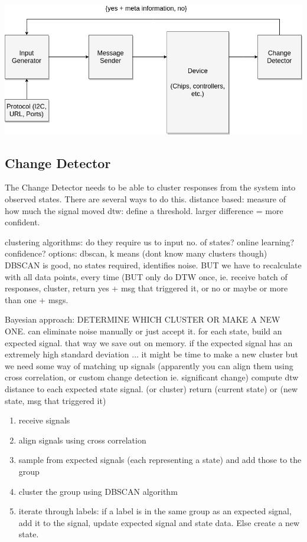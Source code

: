 \documentclass[11pt, a4paper]{article}
\begin{document}
\includegraphics[scale=0.5]{Fuzzer.png}

\subsection*{Change Detector}
The Change Detector needs to be able to cluster responses from the system into observed states.
There are several ways to do this.
distance based: measure of how much the signal moved
dtw: define a threshold. larger difference = more confident.

clustering algorithms: do they require us to input no. of states? online learning? confidence?
options: dbscan, k means (dont know many clusters though)
DBSCAN is good, no states required, identifies noise. BUT we have to recalculate with all data points, every time (BUT only do DTW once, ie. 
receive batch of responses, cluster, return yes + msg that triggered it, or no or maybe or more than one + msgs.

Bayesian approach: DETERMINE WHICH CLUSTER OR MAKE A NEW ONE. can eliminate noise manually or just accept it.
for each state, build an expected signal. that way we save out on memory. 
if the expected signal has an extremely high standard deviation ... it might be time to make a new cluster
but we need some way of matching up signals (apparently you can align them using cross correlation, or custom change detection ie. significant change)
compute dtw distance to each expected state signal. (or cluster)
return (current state) or (new state, msg that triggered it)
 
\begin{enumerate}
    \item receive signals
    \item align signals using cross correlation
    \item sample from expected signals (each representing a state) and add those to the group
    \item cluster the group using DBSCAN algorithm
    \item iterate through labels: if a label is in the same group as an expected signal, add it to the signal, update expected signal and state data. Else create a new state.
\end{enumerate}
\end{document}

